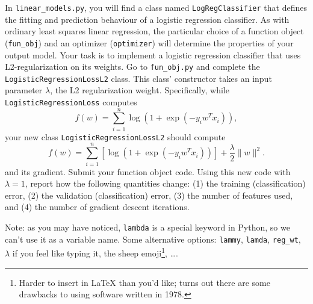\documentclass{article}
\newcommand{\blu}[1]{{\textcolor{blu}{#1}}}
\let\ask\blu
\newcommand{\norm}[1]{\lVert #1 \rVert}
\begin{document}
In \verb|linear_models.py|, you will find a class named \verb|LogRegClassifier| that defines the fitting and prediction behaviour of a logistic regression classifier. As with ordinary least squares linear regression, the particular choice of a function object (\verb|fun_obj|) and an optimizer (\verb|optimizer|) will determine the properties of your output model.
Your task is to implement a logistic regression classifier that uses L2-regularization on its weights. Go to \verb|fun_obj.py| and complete the \verb|LogisticRegressionLossL2| class. This class' constructor takes an input parameter $\lambda$, the L2 regularization weight. Specifically, while \verb|LogisticRegressionLoss| computes
\[
f(w) = \sum_{i=1}^n \log(1+\exp(-y_iw^Tx_i)),
\]
your new class \verb|LogisticRegressionLossL2| should compute
\[
f(w) = \sum_{i=1}^n \left[\log(1+\exp(-y_iw^Tx_i))\right] + \frac{\lambda}{2}\norm{w}^2.
\]
and its gradient.
\ask{Submit your function object code. Using this new code with $\lambda = 1$, report how the following quantities change: (1) the training (classification) error, (2) the validation (classification) error, (3) the number of features used, and (4) the number of gradient descent iterations.}

Note: as you may have noticed, \verb|lambda| is a special keyword in Python, so we can't use it as a variable name.
Some alternative options:
\verb|lammy|,
\verb|lamda|,
\verb|reg_wt|,
$\lambda$ if you feel like typing it,
the sheep emoji\footnote{Harder to insert in \LaTeX{} than you'd like; turns out there are some drawbacks to using software written in 1978.},
\dots.
\end{document}
